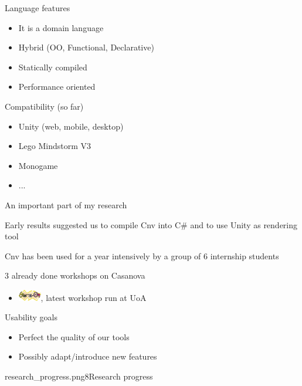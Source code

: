 \documentclass{beamer}
\begin{document}
\begin{slide}{
\item Language features
\begin{itemize}
	\item It is a domain language
	\item Hybrid (OO, Functional, Declarative)
	\item Statically compiled
	\item Performance oriented
\end{itemize}
\item Compatibility (so far)
\begin{itemize}
\item Unity (web, mobile, desktop)
\item Lego Mindstorm V3
\item Monogame
\item ...
\end{itemize}
}\end{slide}


\begin{slide}{
\item An important part of my research
\item Early results suggested us to compile Cnv into C\# and to use Unity as rendering tool
\item Cnv has been used for a year intensively by a group of 6 internship students 
\item 3 already done workshops on Casanova
\item[]
\begin{itemize}
\item \includegraphics[width=1cm]{game_on.png},  latest workshop run at UoA 
\end{itemize}
\item Usability goals
\begin{itemize}
\item Perfect the quality of our tools
\item Possibly adapt/introduce new features
\end{itemize}
}\end{slide}


\begin{pictureSlideWithCaption}
{research_progress.png}{8}{Research progress}
\end{pictureSlideWithCaption}
\end{document}

